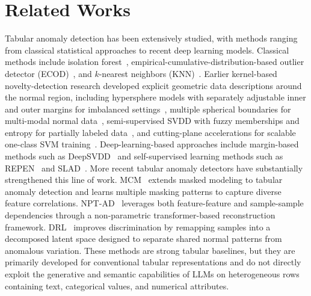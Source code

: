 \section{Related Works}
\label{sec:app:related_works}

Tabular anomaly detection has been extensively studied, with methods ranging from classical statistical approaches to recent deep learning models. Classical methods include isolation forest~\cite{liu2008iforest}, empirical-cumulative-distribution-based outlier detector (ECOD)~\cite{li2022ecod}, and $k$-nearest neighbors (KNN)~\cite{ramaswamy2000knn}. Earlier kernel-based novelty-detection research developed explicit geometric data descriptions around the normal region, including hypersphere models with separately adjustable inner and outer margins for imbalanced settings~\citep{le2010optimal}, multiple spherical boundaries for multi-modal normal data~\citep{le2011multiple}, semi-supervised SVDD with fuzzy memberships and entropy for partially labeled data~\citep{le2013fuzzy}, and cutting-plane accelerations for scalable one-class SVM training~\citep{le2015fast}. Deep-learning-based approaches include margin-based methods such as DeepSVDD~\cite{ruff2018deepsvdd} and self-supervised learning methods such as REPEN~\cite{pang2018repen} and SLAD~\cite{xu2023fascinating}. More recent tabular anomaly detectors have substantially strengthened this line of work. MCM~\citep{yin2024mcm} extends masked modeling to tabular anomaly detection and learns multiple masking patterns to capture diverse feature correlations. NPT-AD~\citep{thimonier2024nptad} leverages both feature-feature and sample-sample dependencies through a non-parametric transformer-based reconstruction framework. DRL~\citep{ye2025drl} improves discrimination by remapping samples into a decomposed latent space designed to separate shared normal patterns from anomalous variation. These methods are strong tabular baselines, but they are primarily developed for conventional tabular representations and do not directly exploit the generative and semantic capabilities of LLMs on heterogeneous rows containing text, categorical values, and numerical attributes.

